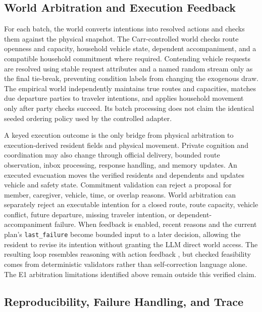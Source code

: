 \documentclass[journal]{IEEEtran}
\begin{document}
\subsection{World Arbitration and Execution Feedback}

For each batch, the world converts intentions into resolved actions and checks
them against the physical snapshot. The Carr-controlled world checks route
openness and capacity, household vehicle state, dependent accompaniment, and a
compatible household commitment where required. Contending vehicle requests
are resolved using stable request attributes and a named random stream only as
the final tie-break, preventing condition labels from changing the exogenous
draw. The empirical world independently maintains true routes and capacities,
matches due departure parties to traveler intentions, and applies household
movement only after party checks succeed. Its batch processing does not claim
the identical seeded ordering policy used by the controlled adapter.

A keyed execution outcome is the only bridge from physical arbitration to
execution-derived resident fields and physical movement. Private cognition and
coordination may also change through official delivery, bounded route
observation, inbox processing, response handling, and memory updates. An
executed evacuation moves the verified residents and dependents and updates
vehicle and safety state. Commitment validation can reject a proposal for
member, caregiver, vehicle, time, or overlap reasons. World arbitration can
separately reject an executable intention for a closed route, route capacity,
vehicle conflict, future departure, missing traveler intention, or dependent-
accompaniment failure. When feedback is enabled, recent reasons and the current
plan's
\texttt{last\_failure} become bounded input to a later decision, allowing the
resident to revise its intention without granting the LLM direct world access.
The resulting loop resembles reasoning with action feedback
\cite{yao2023react,shinn2023reflexion}, but checked feasibility comes from
deterministic validators rather than self-correction language alone. The E1
arbitration limitations identified above remain outside this verified claim.

\subsection{Reproducibility, Failure Handling, and Trace}
\end{document}
